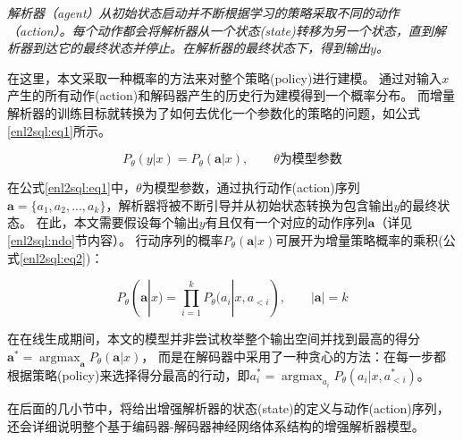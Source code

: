 \textit{解析器（agent）从初始状态启动并不断根据学习的策略采取不同的动作（action）。每个动作都会将解析器从一个状态(state)转移为另一个状态，直到解析器到达它的最终状态并停止。在解析器的最终状态下，得到输出$y$。}

在这里，本文采取一种概率的方法来对整个策略(policy)进行建模。
通过对输入$x$产生的所有动作(action)和解码器产生的历史行为建模得到一个概率分布。
而增量解析器的训练目标就转换为了如何去优化一个参数化的策略的问题，如公式\ref{enl2sql:eq1}所示。

\begin{equation}
    \label{enl2sql:eq1}
    P_{\theta}(y|x) = P_{\theta}(\boldsymbol{a}|x),  \qquad \theta\text{为模型参数}
\end{equation}

在公式\ref{enl2sql:eq1}中，$\theta$为模型参数，通过执行动作(action)序列$\boldsymbol{a} = \{a_{1},a_{2},...,a_{k}\}$，解析器将被不断引导并从初始状态转换为包含输出$y$的最终状态。
在此，本文需要假设每个输出$y$有且仅有一个对应的动作序列$\boldsymbol{a}$（详见\ref{enl2sql:ndo}节内容）。
行动序列的概率$P_{\theta}(\boldsymbol{a}|x)$可展开为增量策略概率的乘积(公式\ref{enl2sql:eq2})：

\begin{equation}
    \label{enl2sql:eq2}
    P_{\theta}(\boldsymbol{a}|x) = \prod^k_{i=1}P_{\theta}(a_{i}|x,a_{<i}),   \qquad |\boldsymbol{a}| = k
\end{equation}

在在线生成期间，本文的模型并非尝试枚举整个输出空间并找到最高的得分$\boldsymbol{a}^{*} = \mathop{\arg\max}_{\boldsymbol{a}} P_{\theta}(\boldsymbol{a}|x)$，
而是在解码器中采用了一种贪心的方法：在每一步都根据策略(policy)来选择得分最高的行动，即$a^{*}_{i} = \mathop{\arg\max}_{a_{i}} P_{\theta}(a_{i}|x,a^{*}_{<i})$。

在后面的几小节中，将给出增强解析器的状态(state)的定义与动作(action)序列，
还会详细说明整个基于编码器-解码器神经网络体系结构的增强解析器模型。


